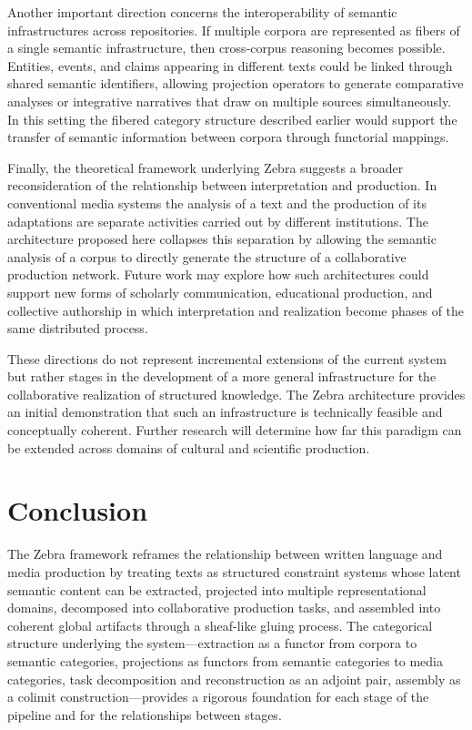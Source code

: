 \documentclass[12pt,a4paper]{article}
\begin{document}
Another important direction concerns the interoperability of semantic infrastructures across repositories. If multiple corpora are represented as fibers of a single semantic infrastructure, then cross-corpus reasoning becomes possible. Entities, events, and claims appearing in different texts could be linked through shared semantic identifiers, allowing projection operators to generate comparative analyses or integrative narratives that draw on multiple sources simultaneously. In this setting the fibered category structure described earlier would support the transfer of semantic information between corpora through functorial mappings.

Finally, the theoretical framework underlying Zebra suggests a broader reconsideration of the relationship between interpretation and production. In conventional media systems the analysis of a text and the production of its adaptations are separate activities carried out by different institutions. The architecture proposed here collapses this separation by allowing the semantic analysis of a corpus to directly generate the structure of a collaborative production network. Future work may explore how such architectures could support new forms of scholarly communication, educational production, and collective authorship in which interpretation and realization become phases of the same distributed process.

These directions do not represent incremental extensions of the current system but rather stages in the development of a more general infrastructure for the collaborative realization of structured knowledge. The Zebra architecture provides an initial demonstration that such an infrastructure is technically feasible and conceptually coherent. Further research will determine how far this paradigm can be extended across domains of cultural and scientific production.

\section{Conclusion}

The Zebra framework reframes the relationship between written language and media production by treating texts as structured constraint systems whose latent semantic content can be extracted, projected into multiple representational domains, decomposed into collaborative production tasks, and assembled into coherent global artifacts through a sheaf-like gluing process. The categorical structure underlying the system—extraction as a functor from corpora to semantic categories, projections as functors from semantic categories to media categories, task decomposition and reconstruction as an adjoint pair, assembly as a colimit construction—provides a rigorous foundation for each stage of the pipeline and for the relationships between stages.
\end{document}
